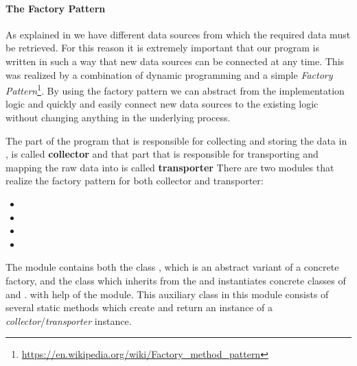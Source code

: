 \paragraph{The Factory Pattern}
\label{par:factory}
As explained in  we have different data sources from which the required data must be retrieved.
For this reason it is extremely important that our program is written in such a way that new data sources can be connected at any time.
This was realized by a combination of dynamic programming and a simple \textit{Factory Pattern}\footnote{\url{https://en.wikipedia.org/wiki/Factory_method_pattern}}.
By using the factory pattern we can abstract from the implementation logic and quickly and easily connect new data sources to the existing logic without changing anything in the underlying process.

The part of the program that is responsible for collecting and storing the data in \gds{}, is called \textbf{collector}
and that part that is responsible for transporting and mapping the raw data into \pg{} is called \textbf{transporter}
There are two modules that realize the factory pattern for both collector and transporter:

\begin{itemize}
  \item {}
  \item {}
  \item {}
  \item {}
\end{itemize}

The module  contains both the class , which is an abstract variant of a concrete factory, and the class
 which inherits from the  and instantiates concrete classes of  and .
with help of the  module.
This auxiliary class in this module consists of several static methods which create and return an instance of a \textit{collector}/\textit{transporter} instance.

